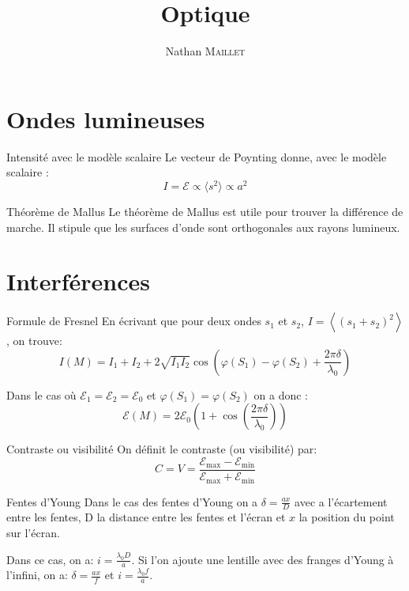 \documentclass[french, a4paper, 11pt, twocolumn]{article}
\title{Optique}
\author{Nathan \textsc{Maillet}}
\date{}
\newcommand{\po}{\left(}         %
\newcommand{\pf}{\right)}        %
\newcommand{\pof}[1]{\po #1 \pf} %
\begin{document}
\maketitle

\section{Ondes lumineuses}
\begin{cadre}{Intensité avec le modèle scalaire}
  Le vecteur de Poynting donne, avec le modèle scalaire :
  \[I=\mathcal{E}\propto \langle s^2\rangle \propto a^2\]
\end{cadre}

\begin{cadre}{Théorème de Mallus}
  Le théorème de Mallus est utile pour trouver la différence de marche.
  Il stipule que les surfaces d'onde sont orthogonales aux rayons lumineux.
\end{cadre}

\section{Interférences}
\begin{cadre}{Formule de Fresnel}
  En écrivant que pour deux ondes \(s_1\) et \(s_2\), \(I=\left\langle(s_1+s_2)^2\right\rangle\), on trouve:
  \[I(M)=I_1+I_2+2\sqrt{I_1I_2}\cos\left(\varphi(S_1)-\varphi(S_2)+\frac{2\pi \delta}{\lambda_0}\right)\]

  \tcblower
  Dans le cas où \(\mathcal{E}_1=\mathcal{E}_2=\mathcal{E}_0\) et \(\varphi(S_1)=\varphi(S_2)\) on a donc :
  \[\mathcal{E}(M)=2\mathcal{E}_0\pof{1+\cos\pof{\frac{2\pi \delta}{\lambda_0}}}\]
\end{cadre}

\begin{cadre}{Contraste ou visibilité}
  On définit le contraste (ou visibilité) par:
  \[C=V=\dfrac{\mathcal{E_{\mathrm{max}}-E_{\mathrm{min}}}}{\mathcal{E_{\mathrm{max}}+E_{\mathrm{min}}}}\]
\end{cadre}

\begin{cadre}{Fentes d'Young}
  Dans le cas des fentes d'Young on a \(\delta=\frac{ax}{D}\) avec a l'écartement entre les fentes, D la distance entre
  les fentes et l'écran et \(x\) la position du point sur l'écran.

  Dans ce cas, on a: \(i=\frac{\lambda_0D}{a}\).
  Si l'on ajoute une lentille avec des franges d'Young à l'infini, on a: \(\delta=\frac{ax}{f}\) et \(i=\frac{\lambda_0f}{a}\).
\end{cadre}
\end{document}
